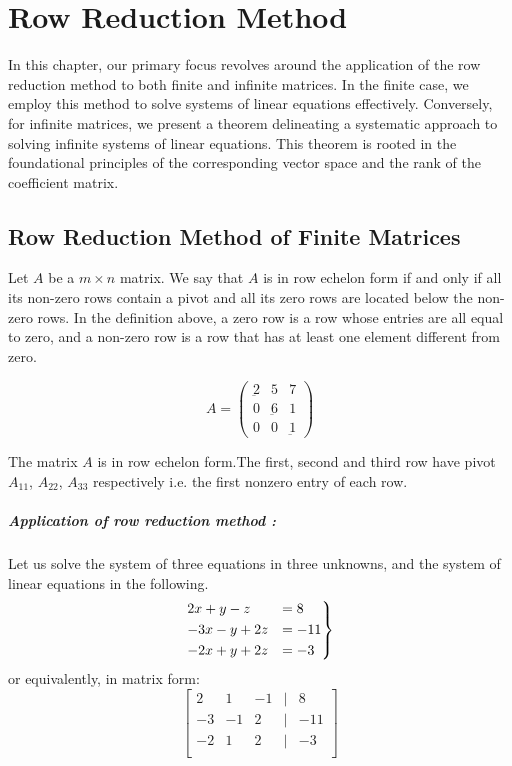 \chapter{Row Reduction Method }
In this chapter, our primary focus revolves around the application of the row reduction method to both finite and infinite matrices. In the finite case, we employ this method to solve systems of linear equations effectively. Conversely, for infinite matrices, we present a theorem delineating a systematic approach to solving infinite systems of linear equations. This theorem is rooted in the foundational principles of the corresponding vector space and the rank of the coefficient matrix.
\section{Row Reduction Method of Finite Matrices}
\begin{definition}
Let $A$ be a $m \times n$ matrix. We say that $A$ is in row echelon form if and only if all its non-zero rows contain a pivot and all its zero rows are located below the non-zero rows.\newline
In the definition above, a zero row is a row whose entries are all equal to zero, and a non-zero row is a row that has at least one element different from zero.
    
\end{definition}

\begin{example}
\[
 A = 
    \begin{pmatrix}
    \underbar2 & 5 & 7\\
    0 & \underbar6 & 1\\
    0 & 0 & \underbar1

\end{pmatrix}
\]
   
The matrix $A$ is in row echelon form.The first, second and third  row have  pivot $A_{11}$, $A_{22}$, $A_{33}$ respectively i.e. the first nonzero entry of each row.
\end{example}

\paragraph{Application of row reduction method :}
Let us solve the system of three equations in three unknowns, and the system of linear equations in the following.
\[
\begin{rcases}
    2x + y - z &= 8 \\
-3x - y + 2z &= -11 \\
-2x + y + 2z &= -3 \\
\end{rcases}
\]
or equivalently, in matrix form:
\[
\begin{bmatrix}
2 & 1 & -1 & | & 8 \\
-3 & -1 & 2 & | & -11 \\
-2 & 1 & 2 & | & -3 \\
\end{bmatrix}
\]

